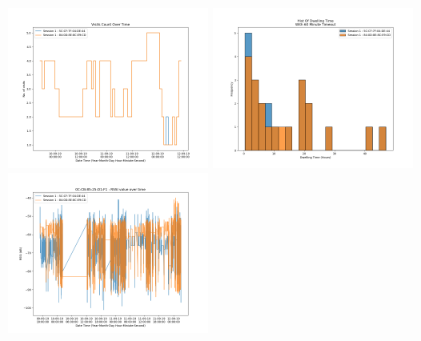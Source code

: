 \documentclass{report}
\begin{document}
\begin{figure}[h!]
    \centering
    \includegraphics[width=200]{count_over_time_sep_counters.png}
    \includegraphics[width=200]{Hist_Dwelling_Time_60M_TO_Sep_Counter.png}
    \includegraphics[width=200]{rssi_over_time_for_0C_CB_85_25_D1_F1_sep_counter.png}

\end{figure}
\end{document}
